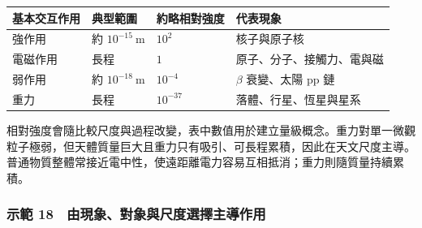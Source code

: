 \documentclass[11pt,a4paper]{article}
\newcounter{none}
\begin{document}
{\def\LTcaptype{none} %
\begin{longtable}[]{@{}
  >{\raggedright\arraybackslash}p{}
  >{\raggedleft\arraybackslash}p{}
  >{\raggedleft\arraybackslash}p{}
  >{\raggedright\arraybackslash}p{}@{}}
\toprule\noalign{}
\begin{minipage}[b]{\linewidth}\raggedright
基本交互作用
\end{minipage} & \begin{minipage}[b]{\linewidth}\raggedleft
典型範圍
\end{minipage} & \begin{minipage}[b]{\linewidth}\raggedleft
約略相對強度
\end{minipage} & \begin{minipage}[b]{\linewidth}\raggedright
代表現象
\end{minipage} \\
\midrule\noalign{}
\endhead
\bottomrule\noalign{}
\endlastfoot
強作用 & 約 \(10^{-15}\ \mathrm m\) & \(10^2\) & 核子與原子核 \\
電磁作用 & 長程 & \(1\) & 原子、分子、接觸力、電與磁 \\
弱作用 & 約 \(10^{-18}\ \mathrm m\) & \(10^{-4}\) & \(\beta\) 衰變、太陽 pp 鏈 \\
重力 & 長程 & \(10^{-37}\) & 落體、行星、恆星與星系 \\
\end{longtable}
}

相對強度會隨比較尺度與過程改變，表中數值用於建立量級概念。重力對單一微觀粒子極弱，但天體質量巨大且重力只有吸引、可長程累積，因此在天文尺度主導。普通物質整體常接近電中性，使遠距離電力容易互相抵消；重力則隨質量持續累積。

\subsubsection{示範 18　由現象、對象與尺度選擇主導作用}\label{ux793aux7bc4-18-ux7531ux73feux8c61ux5c0dux8c61ux8207ux5c3aux5ea6ux9078ux64c7ux4e3bux5c0eux4f5cux7528}
\end{document}
